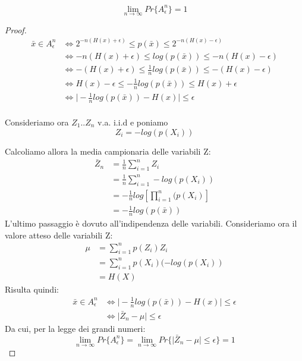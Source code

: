 \begin{teorema}[AEP]
 \[
  \lim_{n \to \infty} Pr\{A_{\epsilon}^n\}=1
 \]
 \begin{proof}
  \[
  \begin{split}
    \bar{x} \in A_{\epsilon}^n &\iff 2^{-n(H(x)+\epsilon)} \le p(\bar{x}) \le 2^{-n(H(x)-\epsilon)} \\
    &\iff -n(H(x)+\epsilon) \le log(p(\bar{x})) \le -n(H(x)-\epsilon) \\
    &\iff -(H(x)+\epsilon) \le \frac{1}{n} log(p(\bar{x})) \le -(H(x)-\epsilon) \\
    &\iff H(x)-\epsilon \le -\frac{1}{n} log(p(\bar{x})) \le H(x)+\epsilon \\
    &\iff \mid -\frac{1}{n} log(p(\bar{x})) - H(x) \mid \le \epsilon  \\
  \end{split}
  \]

 Consideriamo ora $Z_1..Z_n$ v.a. i.i.d e poniamo
 \[
  Z_i= -log( p(X_i) )
 \]
 
  \noindent
  Calcoliamo allora la media campionaria delle variabili Z:
  \[
  \begin{split}
   \bar{Z}_n &=\frac{1}{n} \sum_{i=1}^n Z_i \\
             &=\frac{1}{n} \sum_{i=1}^n -log(p(X_i)) \\
             &=-\frac{1}{n} log \left [ \prod_{i=1}^n (p(X_i) \right] \\
             &=-\frac{1}{n} log(p(\bar{x}))
  \end{split}
  \]
  L'ultimo passaggio è dovuto all'indipendenza delle variabili.
  Consideriamo ora il valore atteso delle variabili Z:
  \[
  \begin{split}
   \mu &=\sum_{i=1}^n p(Z_i) Z_i \\
        &=\sum_{i=1}^n p(X_i)(-log(p(X_i)) \\
             &=H(X)
  \end{split}
  \]
  Risulta quindi:
  \[ \begin{split}
   \bar{x} \in A_{\epsilon}^n &\iff \mid -\frac{1}{n} log(p(\bar{x})) - H(x) \mid \le \epsilon \\
   &\iff \mid \bar{Z}_n - \mu \mid \le \epsilon
    \end{split}
  \]
  Da cui, per la legge dei grandi numeri:
  \[
  \lim_{n \to \infty} Pr\{A_{\epsilon}^n\}=
     \lim_{n \to \infty} Pr\{ \mid \bar{Z}_n - \mu \mid \le \epsilon \}=1
 \]

 \end{proof}

\end{teorema}

